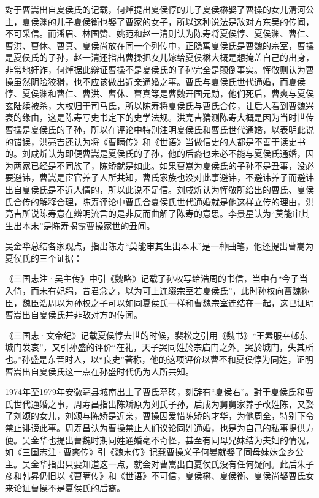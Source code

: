 對于曹嵩出自夏侯氏的记载，何焯提出夏侯惇的儿子夏侯楙娶了曹操的女儿清河公主，夏侯渊的儿子夏侯衡也娶了曹家的女子，所以这种说法是敌对方东吴的传闻，不可采信。而潘眉、林国赞、姚范和赵一清则认为陈寿将夏侯惇、夏侯渊、曹仁、曹洪、曹休、曹真、夏侯尚放在同一个列传中，正隐寓夏侯氏是曹魏的宗室，曹操是夏侯氏的子孙，赵一清还指出曹操把女儿嫁给夏侯楙大概是想掩盖自己的出身，非常地奸诈，何焯据此辩证曹操不是夏侯氏的子孙完全是颠倒事实。恽敬则认为曹操虽然阴险狡猾，也不应该做出近亲通婚之事。曹氏与夏侯氏世代通婚，而夏侯惇、夏侯渊和曹仁、曹洪、曹休、曹真等是曹魏开国元勋，他们死后，曹爽与夏侯玄陆续被杀，大权归于司马氏，所以陈寿将夏侯氏与曹氏合传，让后人看到曹魏兴衰的缘由，这是陈寿写史书定下的史学法规。洪亮吉猜测陈寿大概是因为当时世传曹操是夏侯氏的子孙，所以在评论中特别注明夏侯氏和曹氏世代通婚，以表明此说的错误，洪亮吉还认为将《曹瞒传》和《世语》当做信史的人都是不善于读史书的。刘咸炘认为即便曹嵩是夏侯氏的子孙，他的后裔也未必不能与夏侯氏通婚，因为两家已经是不同族了，陈矫就是如此。如果曹嵩为夏侯氏的子孙不是丑事，没必要避讳，曹嵩是宦官养子人所共知，曹氏家族也没对此事避讳，不避讳养子而避讳出自夏侯氏是不近人情的，所以此说不足信。刘咸炘认为恽敬所给出的曹氏、夏侯氏合传的解释合理，陈寿评论中曹氏合夏侯氏世代通婚就是他这样立传的理由，洪亮吉所说陈寿意在辨明流言的是非反而曲解了陈寿的意思。李景星认为“莫能审其生出本末”是陈寿揭露曹操家世的丑闻。

吴金华总结各家观点，指出陈寿“莫能审其生出本末”是一种曲笔，他还提出曹嵩为夏侯氏的三个证据：

《三国志注·吴主传》中引《魏略》记载了孙权写给浩周的书信，当中有“今子当入侍，而未有妃耦，昔君念之，以为可上连缀宗室若夏侯氏”，此时孙权向曹魏称臣，魏臣浩周以为孙权之子可以如同夏侯氏一样和曹魏宗室连结在一起，这已证明曹嵩出自夏侯氏并非敌对方的传闻。

《三国志·文帝纪》记载夏侯惇去世的时候，裴松之引用《魏书》“王素服幸邺东城门发哀”，又引孙盛的评价“在礼，天子哭同姓於宗庙门之外。哭於城门，失其所也。”孙盛是东晋时人，以“良史”著称，他的这项评价以曹丕和夏侯惇为同姓，证明曹嵩出自夏侯氏这一点在孙盛时代仍为人所共知。

1974年至1979年安徽亳县城南出土了曹氏墓砖，刻辞有“夏侯右”。對于夏侯氏和曹氏世代通婚之事，周寿昌指出陈矫原为刘氏子孙，后成为舅舅家养子改姓陈，又娶了刘颂的女儿，刘颂与陈矫是近亲，曹操因爱惜陈矫的才华，为他周全，特别下令禁止诽谤此事。周寿昌认为曹操禁止人们议论同姓通婚，也是为自己的私事提供方便。吴金华也提出曹魏时期同姓通婚毫不奇怪，甚至有同母兄妹结为夫妇的情况，如《三国志注·曹爽传》引《魏末传》记载曹操义子何晏就娶了同母妹妹金乡公主。吴金华指出只要知道这一点，就会对曹嵩出自夏侯氏没有任何疑问。此后朱子彦和韩昇仍旧以《曹瞒传》和《世语》不可信，夏侯楙、夏侯衡、夏侯尚娶曹氏女来论证曹操不是夏侯氏的后裔。

